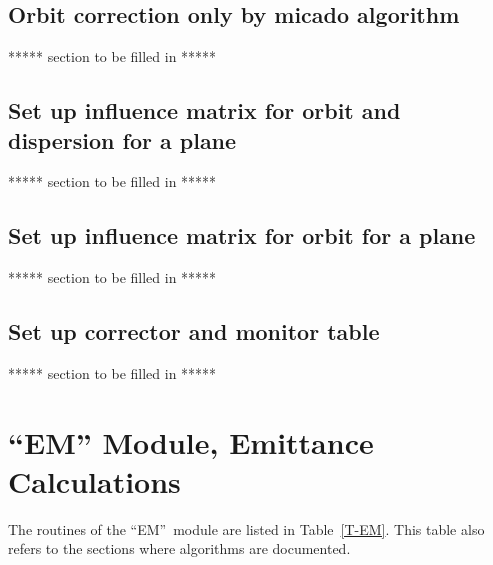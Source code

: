 \section{Orbit correction only by micado algorithm}
\label{COLORB}
***** section to be filled in *****

\section{Set up influence matrix for orbit and dispersion for a plane}
\label{COMDIS}
***** section to be filled in *****

\section{Set up influence matrix for orbit for a plane}
\label{COMORB}
***** section to be filled in *****

\section{Set up corrector and monitor table}
\label{COTBLE}
***** section to be filled in *****



\chapter{``EM'' Module, Emittance Calculations}
The routines of the ``EM''~module are listed in Table~\ref{T-EM}.
This table also refers to the sections where algorithms are
documented.


